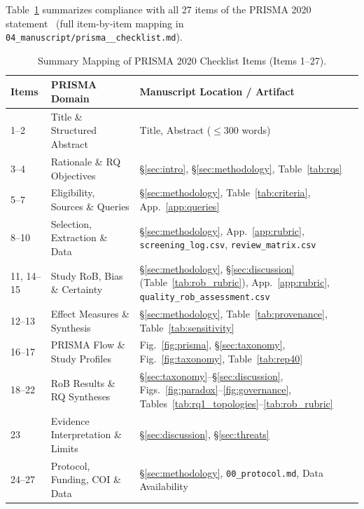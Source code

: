 \documentclass[10pt,twocolumn,a4paper]{article}
\begin{document}
Table~\ref{tab:prisma_checklist} summarizes compliance with all 27 items of the PRISMA 2020 statement~\cite{page2021prisma} (full item-by-item mapping in \texttt{04\_\allowbreak manuscript/\allowbreak prisma\_\_\allowbreak checklist.\allowbreak md}).

\begin{table}[t!]
\centering
\caption{Summary Mapping of PRISMA 2020 Checklist Items (Items 1--27).}
\label{tab:prisma_checklist}
\scriptsize
\setlength{\tabcolsep}{2.8pt}
\begin{tabularx}{\columnwidth}{l >{\raggedright\arraybackslash}p{2.12cm} X}
\toprule
\textbf{Items} & \textbf{PRISMA Domain} & \textbf{Manuscript Location / Artifact} \\
\midrule
1--2 & Title \& Structured Abstract & Title, Abstract ($\le 300$ words) \\
3--4 & Rationale \& RQ Objectives & \S\ref{sec:intro}, \S\ref{sec:methodology}, Table~\ref{tab:rqs} \\
5--7 & Eligibility, Sources \& Queries & \S\ref{sec:methodology}, Table~\ref{tab:criteria}, App.~\ref{app:queries} \\
8--10 & Selection, Extraction \& Data & \S\ref{sec:methodology}, App.~\ref{app:rubric}, \texttt{screening\_log.csv}, \texttt{review\_matrix.csv} \\
11, 14--15 & Study RoB, Bias \& Certainty & \S\ref{sec:methodology}, \S\ref{sec:discussion} (Table~\ref{tab:rob_rubric}), App.~\ref{app:rubric}, \texttt{quality\_\allowbreak rob\_\allowbreak assessment.\allowbreak csv} \\
12--13 & Effect Measures \& Synthesis & \S\ref{sec:methodology}, Table~\ref{tab:provenance}, Table~\ref{tab:sensitivity} \\
16--17 & PRISMA Flow \& Study Profiles & Fig.~\ref{fig:prisma}, \S\ref{sec:taxonomy}, Fig.~\ref{fig:taxonomy}, Table~\ref{tab:rep40} \\
18--22 & RoB Results \& RQ Syntheses & \S\ref{sec:taxonomy}--\S\ref{sec:discussion}, Figs.~\ref{fig:paradox}--\ref{fig:governance}, Tables~\ref{tab:rq1_topologies}--\ref{tab:rob_rubric} \\
23 & Evidence Interpretation \& Limits & \S\ref{sec:discussion}, \S\ref{sec:threats} \\
24--27 & Protocol, Funding, COI \& Data & \S\ref{sec:methodology}, \texttt{00\_protocol.md}, Data Availability \\
\bottomrule
\end{tabularx}
\end{table}
\end{document}
